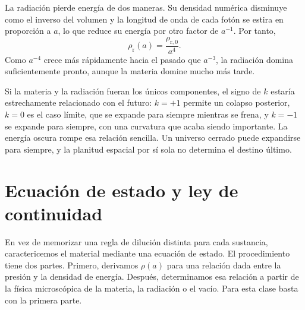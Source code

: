 \begin{classroomqa}
\end{classroomqa}

La radiación pierde energía de dos maneras. Su densidad numérica disminuye como el inverso del volumen y la longitud de onda de cada fotón se estira en proporción a \(a\), lo que reduce su energía por otro factor de \(a^{-1}\). Por tanto,
\begin{equation}
\rho_{\mathrm r}(a)=\frac{\rho_{\mathrm r,0}}{a^4}.
\label{eq:c04-radiation-scaling}
\end{equation}
Como \(a^{-4}\) crece más rápidamente hacia el pasado que \(a^{-3}\), la radiación domina suficientemente pronto, aunque la materia domine mucho más tarde.

Si la materia y la radiación fueran los únicos componentes, el signo de \(k\) estaría estrechamente relacionado con el futuro: \(k=+1\) permite un colapso posterior, \(k=0\) es el caso límite, que se expande para siempre mientras se frena, y \(k=-1\) se expande para siempre, con una curvatura que acaba siendo importante. La energía oscura rompe esa relación sencilla. Un universo cerrado puede expandirse para siempre, y la planitud espacial por sí sola no determina el destino último.

\section{Ecuación de estado y ley de continuidad}

En vez de memorizar una regla de dilución distinta para cada sustancia, caractericemos el material mediante una ecuación de estado. El procedimiento tiene dos partes. Primero, derivamos \(\rho(a)\) para una relación dada entre la presión y la densidad de energía. Después, determinamos esa relación a partir de la física microscópica de la materia, la radiación o el vacío. Para esta clase basta con la primera parte.

